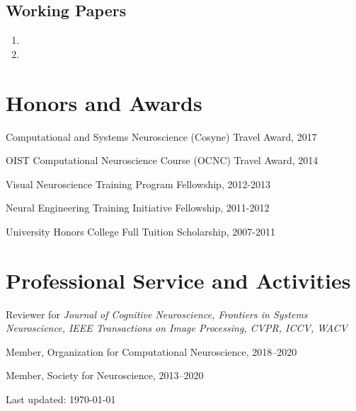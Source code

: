 \documentclass[10pt,letterpaper]{article}
\def\footerlink{} %
\renewenvironment{itemize}{
  \begin{list}{}{
    \setlength{\leftmargin}{1.5em}
    \setlength{\itemsep}{0.25em}
    \setlength{\parskip}{0pt}
    \setlength{\parsep}{0.25em}
  }
}{
  \end{list}
}
\begin{document}
\subsection*{Working Papers}
\begin{enumerate}[resume]
\item {}
\item {}
\end{enumerate}

\vspace{-0.25in}

\section*{Honors and Awards}
\vspace{-0.05in}
\begin{itemize}
  \setlength\itemsep{1pt}
  \item Computational and Systems Neuroscience (Cosyne) Travel Award, 2017
  \item OIST Computational Neuroscience Course (OCNC) Travel Award, 2014
  \item Visual Neuroscience Training Program Fellowship, 2012-2013
  \item Neural Engineering Training Initiative Fellowship, 2011-2012
  \item University Honors College Full Tuition Scholarship, 2007-2011
\end{itemize}

\vspace{-0.25in}

\section*{Professional Service and Activities}
\vspace{-0.05in}
\begin{itemize}
  \setlength\itemsep{1pt}
  \item Reviewer for \textit{Journal of Cognitive Neuroscience, Frontiers in Systems Neuroscience, IEEE Transactions on Image Processing, CVPR, ICCV, WACV}
  \item Member, Organization for Computational Neuroscience, 2018--2020
  \item Member, Society for Neuroscience, 2013--2020
\end{itemize}

\bigskip

\begin{center}
  \begin{footnotesize}
    Last updated: \today \\
    \href{\footerlink}{\texttt{\footerlink}}
  \end{footnotesize}
\end{center}
\end{document}

